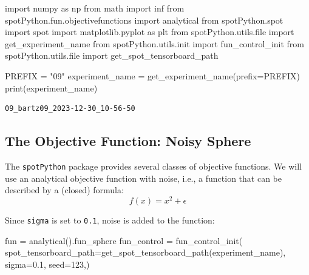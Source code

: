 \documentclass[
  letterpaper,
  DIV=11,
  numbers=noendperiod]{scrreprt}
\newenvironment{Shaded}{\begin{snugshade}}{\end{snugshade}}
\newcommand{\BuiltInTok}[1]{\textcolor[rgb]{0.00,0.23,0.31}{#1}}
\newcommand{\DecValTok}[1]{\textcolor[rgb]{0.68,0.00,0.00}{#1}}
\newcommand{\FloatTok}[1]{\textcolor[rgb]{0.68,0.00,0.00}{#1}}
\newcommand{\ImportTok}[1]{\textcolor[rgb]{0.00,0.46,0.62}{#1}}
\newcommand{\NormalTok}[1]{\textcolor[rgb]{0.00,0.23,0.31}{#1}}
\newcommand{\OperatorTok}[1]{\textcolor[rgb]{0.37,0.37,0.37}{#1}}
\newcommand{\StringTok}[1]{\textcolor[rgb]{0.13,0.47,0.30}{#1}}
\begin{document}
\begin{Shaded}
\begin{Highlighting}[]
\ImportTok{import}\NormalTok{ numpy }\ImportTok{as}\NormalTok{ np}
\ImportTok{from}\NormalTok{ math }\ImportTok{import}\NormalTok{ inf}
\ImportTok{from}\NormalTok{ spotPython.fun.objectivefunctions }\ImportTok{import}\NormalTok{ analytical}
\ImportTok{from}\NormalTok{ spotPython.spot }\ImportTok{import}\NormalTok{ spot}
\ImportTok{import}\NormalTok{ matplotlib.pyplot }\ImportTok{as}\NormalTok{ plt}
\ImportTok{from}\NormalTok{ spotPython.utils.}\BuiltInTok{file} \ImportTok{import}\NormalTok{ get\_experiment\_name}
\ImportTok{from}\NormalTok{ spotPython.utils.init }\ImportTok{import}\NormalTok{ fun\_control\_init}
\ImportTok{from}\NormalTok{ spotPython.utils.}\BuiltInTok{file} \ImportTok{import}\NormalTok{ get\_spot\_tensorboard\_path}

\NormalTok{PREFIX }\OperatorTok{=} \StringTok{"09"}
\NormalTok{experiment\_name }\OperatorTok{=}\NormalTok{ get\_experiment\_name(prefix}\OperatorTok{=}\NormalTok{PREFIX)}
\BuiltInTok{print}\NormalTok{(experiment\_name)}
\end{Highlighting}
\end{Shaded}

\begin{verbatim}
09_bartz09_2023-12-30_10-56-50
\end{verbatim}

\hypertarget{the-objective-function-noisy-sphere-1}{%
\subsection{The Objective Function: Noisy
Sphere}\label{the-objective-function-noisy-sphere-1}}

The \texttt{spotPython} package provides several classes of objective
functions. We will use an analytical objective function with noise,
i.e., a function that can be described by a (closed) formula:
\[f(x) = x^2 + \epsilon\]

Since \texttt{sigma} is set to \texttt{0.1}, noise is added to the
function:

\begin{Shaded}
\begin{Highlighting}[]
\NormalTok{fun }\OperatorTok{=}\NormalTok{ analytical().fun\_sphere}
\NormalTok{fun\_control }\OperatorTok{=}\NormalTok{ fun\_control\_init(}
\NormalTok{    spot\_tensorboard\_path}\OperatorTok{=}\NormalTok{get\_spot\_tensorboard\_path(experiment\_name),}
\NormalTok{    sigma}\OperatorTok{=}\FloatTok{0.1}\NormalTok{,}
\NormalTok{    seed}\OperatorTok{=}\DecValTok{123}\NormalTok{,)}
\end{Highlighting}
\end{Shaded}
\end{document}

